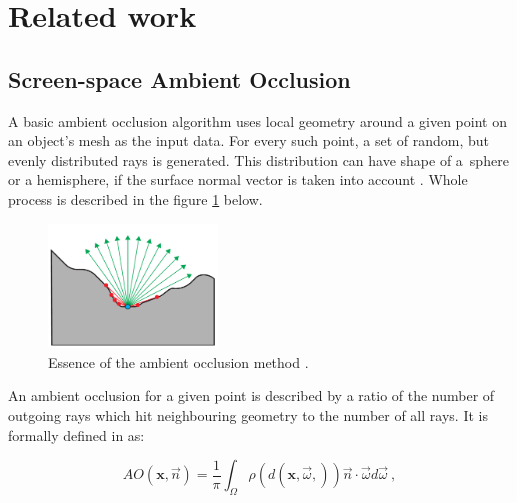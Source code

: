 \documentclass[10pt,journal,compsoc,twoside]{IEEEtran}
\begin{document}
\section{Related work}\label{t:related}

	\subsection{Screen-space Ambient Occlusion}\label{t:related:ssao}
	
	A basic ambient occlusion algorithm uses local geometry around a given point on an object's mesh as the input data. For every such point, a set of random, but evenly distributed rays is generated. This distribution can have shape of a~sphere or a hemisphere, if the surface normal vector is taken into account \cite{ao}. Whole process is described in the figure \ref{fig:2_A} below.
	
	\begin{figure}[ht] %
		\centering
		\includegraphics[width=0.4\textwidth]{fig_2_A.png}
		\caption{Essence of the ambient occlusion method \cite{statvo}.}
		\label{fig:2_A}
	\end{figure}

	An ambient occlusion for a given point is described by a ratio of the number of outgoing rays which hit neighbouring geometry to the number of all rays. It is formally defined in \cite{sloan} as:
	
	\begin{equation}
	\mathit{AO}(\mathbf{x}, \vec{n}) = \frac{1}{\pi}\int_{\Omega}^{}\rho(\mathit{d}(\mathbf{x}, \vec{\omega},))\vec{n}\cdot \vec{\omega}d\vec{\omega}\ ,
	\end{equation}
	
\end{document}
